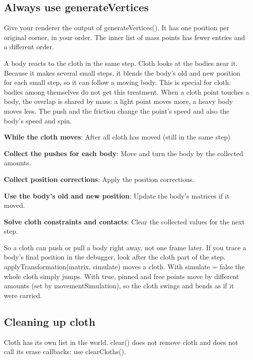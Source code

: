 \documentclass[11pt,a4paper]{article}
\begin{document}
\subsection*{Always use generateVertices}
Give your renderer the output of generateVertices(). It has one position per original corner, in your order. The inner list of mass points has fewer entries and a different order.

\label{vpe-core-18}
A body reacts to the cloth in the same step. Cloth looks at the bodies near it. Because it makes several small steps, it blends the body's old and new position for each small step, so it can follow a moving body. This is special for cloth: bodies among themselves do not get this treatment. When a cloth point touches a body, the overlap is shared by mass: a light point moves more, a heavy body moves less. The push and the friction change the point's speed and also the body's speed and spin.

\textbf{While the cloth moves}: After all cloth has moved (still in the same step)

\textbf{Collect the pushes for each body}: Move and turn the body by the collected amounts.

\textbf{Collect position corrections}: Apply the position corrections.

\textbf{Use the body's old and new position}: Update the body's matrices if it moved.

\textbf{Solve cloth constraints and contacts}: Clear the collected values for the next step.

So a cloth can push or pull a body right away, not one frame later. If you trace a body's final position in the debugger, look after the cloth part of the step. applyTransformation(matrix, simulate) moves a cloth. With simulate = false the whole cloth simply jumps. With true, pinned and free points move by different amounts (set by movementSimulation), so the cloth swings and bends as if it were carried.

\subsection*{Cleaning up cloth}
Cloth has its own list in the world. clear() does not remove cloth and does not call its erase callbacks: use clearCloths().
\end{document}
